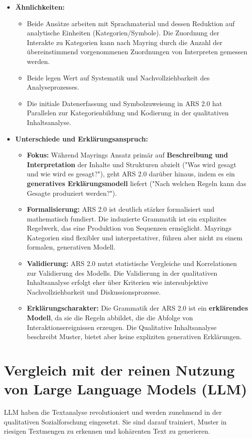 \documentclass{article}
\begin{document}
\begin{itemize}
    \item \textbf{Ähnlichkeiten:}
    \begin{itemize}
        \item Beide Ansätze arbeiten mit Sprachmaterial und dessen Reduktion auf analytische Einheiten (Kategorien/Symbole). Die Zuordnung der Interakte zu Kategorien kann nach Mayring durch die Anzahl der übereinstimmend vorgenommenen Zuordnungen von Interpreten gemessen werden.
        \item Beide legen Wert auf Systematik und Nachvollziehbarkeit des Analyseprozesses.
        \item Die initiale Datenerfassung und Symbolzuweisung in ARS 2.0 hat Parallelen zur Kategorienbildung und Kodierung in der qualitativen Inhaltsanalyse.
    \end{itemize}
    \item \textbf{Unterschiede und Erklärungsanspruch:}
    \begin{itemize}
        \item \textbf{Fokus:} Während Mayrings Ansatz primär auf \textbf{Beschreibung und Interpretation} der Inhalte und Strukturen abzielt ("Was wird gesagt und wie wird es gesagt?"), geht ARS 2.0 darüber hinaus, indem es ein \textbf{generatives Erklärungsmodell} liefert ("Nach welchen Regeln kann das Gesagte produziert werden?").
        \item \textbf{Formalisierung:} ARS 2.0 ist deutlich stärker formalisiert und mathematisch fundiert. Die induzierte Grammatik ist ein explizites Regelwerk, das eine Produktion von Sequenzen ermöglicht. Mayrings Kategorien sind flexibler und interpretativer, führen aber nicht zu einem formalen, generativen Modell.
        \item \textbf{Validierung:} ARS 2.0 nutzt statistische Vergleiche und Korrelationen zur Validierung des Modells. Die Validierung in der qualitativen Inhaltsanalyse erfolgt eher über Kriterien wie intersubjektive Nachvollziehbarkeit und Diskussionsprozesse.
        \item \textbf{Erklärungscharakter:} Die Grammatik der ARS 2.0 ist ein \textbf{erklärendes Modell}, da sie die Regeln abbildet, die die Abfolge von Interaktionsereignissen erzeugen. Die Qualitative Inhaltsanalyse beschreibt Muster, bietet aber keine expliziten generativen Erklärungen.
    \end{itemize}
\end{itemize}

\section{Vergleich mit der reinen Nutzung von Large Language Models (LLM)}
LLM haben die Textanalyse revolutioniert und werden zunehmend in der qualitativen Sozialforschung eingesetzt. Sie sind darauf trainiert, Muster in riesigen Textmengen zu erkennen und kohärenten Text zu generieren.
\end{document}
